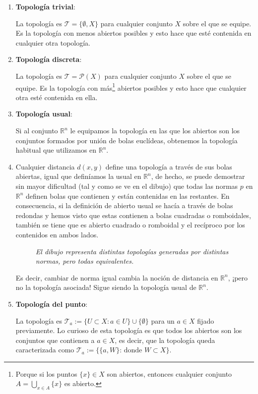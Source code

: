 \begin{ej}
\begin{enumerate}
    \item \textbf{Topología trivial}: \label{ejemplos_topologia:first}
    
    La topología es $\mathcal{T} = \{\emptyset, X\}$ para cualquier conjunto $X$ sobre el que se equipe. Es la topología con menos abiertos posibles y esto hace que esté contenida en cualquier otra topología.
    \item \textbf{Topología discreta}:
    
    La topología es $\mathcal{T} = \mathcal{P}\left( X \right)$ para cualquier conjunto $X$ sobre el que se equipe. Es la topología con más\footnote{Porque si los puntos $\{x\} \in X$ son abiertos, entonces cualquier conjunto $A = \bigcup_{x \in A} \{x\}$ es abierto.} abiertos posibles y esto hace que cualquier otra esté contenida en ella.
    \item \textbf{Topología usual}:
    
    Si al conjunto $\mathbb{R}^n$ le equipamos la topología en las que los abiertos son los conjuntos formados por unión de bolas euclídeas, obtenemos la topología habitual que utilizamos en $\mathbb{R}^n$.
    
    \item Cualquier distancia $d(x,y)$ define una topología a través de sus bolas abiertas, igual que definíamos la usual en $\mathbb{R}^n$, de hecho, se puede demostrar sin mayor dificultad (tal y como se ve en el dibujo) que todas las normas $p$ en $\mathbb{R}^n$ definen bolas que contienen y están contenidas en las restantes. En consecuencia, si la definición de abierto usual se hacía a través de bolas redondas y hemos visto que estas contienen a bolas cuadradas o romboidales, también se tiene que es abierto cuadrado o romboidal y el recíproco por los contenidos en ambos lados.
    \begin{figure}[H]
        \centering
        \caption{\textit{El dibujo representa distintas topologías generadas por distintas normas, pero todas equivalentes.}}
        \label{fig:normas-topología}
    \end{figure}

    Es decir, cambiar de norma igual cambia la noción de distancia en $\mathbb{R}^n$, ¡pero no la topología asociada! Sigue siendo la topología usual de $\mathbb{R}^n$.
    
    \item \textbf{Topología del punto}:
    
    La topología es $\mathcal{T}_a := \{U \subset X: a \in U\} \cup \{\emptyset\}$ para un $a\in X$ fijado previamente. Lo curioso de esta topología es que todos los abiertos son los conjuntos que contienen a $a\in X$, es decir, que la topología queda caracterizada como $\mathcal{T}_a := \{\{a, W\} \text{: donde }W\subset X\}$.
\end{enumerate}
\end{ej}

